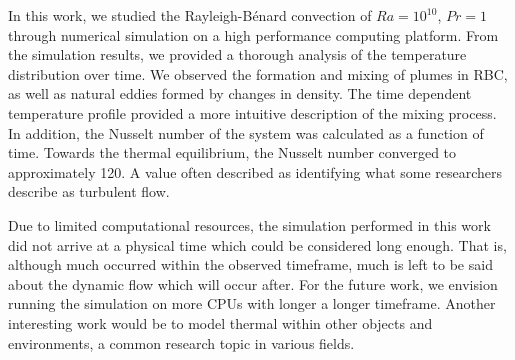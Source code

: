 In this work, we studied the Rayleigh-Bénard convection of $Ra=10^{10}$, $Pr=1$ through numerical simulation on a high performance computing platform. From the simulation results, we provided a thorough analysis of the temperature distribution over time. We observed the formation and mixing of plumes in RBC, as well as natural eddies formed by changes in density. The time dependent temperature profile provided a more intuitive description of the mixing process. In addition, the Nusselt number of the system was calculated as a function of time. Towards the thermal equilibrium, the Nusselt number converged to approximately 120. A value often described as identifying what some researchers describe as turbulent flow. 

Due to limited computational resources, the simulation performed in this work did not arrive at a physical time which could be considered long enough. That is, although much occurred within the observed timeframe, much is left to be said about the dynamic flow which will occur after. For the future work, we envision running the simulation on more CPUs with longer a longer timeframe. Another interesting work would be to model thermal within other objects and environments, a common research topic in various fields.